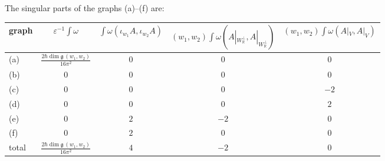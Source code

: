 \begin{proposition}
\label{prop:c5-table}
The singular parts of the graphs (a)--(f) are:

\begin{tabular}{l|c|c|c|c}
graph & $\varepsilon^{-1}\int\omega$ & $\int\omega(\iota_{w_1}A,\iota_{w_2}A)$ & $(w_1,w_2)\int\omega(A|_{W_{\mathbb R}^\perp},A|_{W_{\mathbb R}^\perp})$ & $(w_1,w_2)\int\omega(A|_V,A|_V)$ \\
\hline
(a) & $\frac{2\hbar\dim\mathfrak g\,(w_1,w_2)}{16\pi^2}$ & $0$ & $0$ & $0$ \\
(b) & $0$ & $0$ & $0$ & $0$ \\
(c) & $0$ & $0$ & $0$ & $-2$ \\
(d) & $0$ & $0$ & $0$ & $2$ \\
(e) & $0$ & $2$ & $-2$ & $0$ \\
(f) & $0$ & $2$ & $0$ & $0$ \\
\hline
total & $\frac{2\hbar\dim\mathfrak g\,(w_1,w_2)}{16\pi^2}$ & $4$ & $-2$ & $0$ \\
\end{tabular}
\end{proposition}

